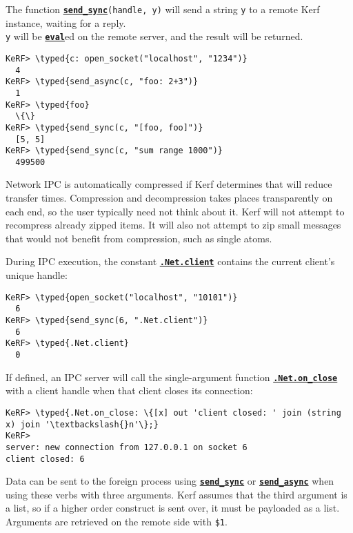 \documentclass{article}
\newcommand{\typed}[1]{\textcolor{TealBlue}{#1}}
\newcommand{\primu}[2]{\hyperref[prim:#2]{\textbf{\texttt{#1}}}}
\newcommand{\prim}[1]{\primu{#1}{#1}}
\newcommand{\const}[2]{\hyperref[const:#2]{\textbf{\texttt{#1}}}}
\begin{document}
\vspace{0.5cm}

The function \primu{send\_sync}{sendSync}\texttt{(handle, y)} will send a string \texttt{y} to a remote Kerf instance, waiting for a reply. \\\texttt{y} will be \prim{eval}ed on the remote server, and the result will be returned.

\begin{Verbatim}
KeRF> \typed{c: open_socket("localhost", "1234")}
  4
KeRF> \typed{send_async(c, "foo: 2+3")}
  1
KeRF> \typed{foo}
  \{\}
KeRF> \typed{send_sync(c, "[foo, foo]")}
  [5, 5]
KeRF> \typed{send_sync(c, "sum range 1000")}
  499500
\end{Verbatim}

Network IPC is automatically compressed if Kerf determines that will reduce transfer times. Compression and decompression takes places transparently on each end, so the user typically need not think about it. Kerf will not attempt to recompress already zipped items. It will also not attempt to zip small messages that would not benefit from compression, such as single atoms.

\vspace{0.5cm}

During IPC execution, the constant \const{.Net.client}{netClient} contains the current client's unique handle:
\begin{Verbatim}
KeRF> \typed{open_socket("localhost", "10101")}
  6
KeRF> \typed{send_sync(6, ".Net.client")}
  6
KeRF> \typed{.Net.client}
  0
\end{Verbatim}

\pagebreak
If defined, an IPC server will call the single-argument function \const{.Net.on\_close}{netOnClose} with a client handle when that client closes its connection:
\begin{Verbatim}
KeRF> \typed{.Net.on_close: \{[x] out 'client closed: ' join (string x) join '\textbackslash{}n'\};}
KeRF> 
server: new connection from 127.0.0.1 on socket 6
client closed: 6

\end{Verbatim}

\vspace{0.5cm}
Data can be sent to the foreign process using \primu{send\_sync}{sendSync} or \primu{send\_async}{sendAsync} when using these verbs with three arguments. Kerf assumes that the third argument is a list, so if a higher order construct is sent over, it must be payloaded as a list. Arguments are retrieved on the remote side with \texttt{\$1}.
\end{document}
